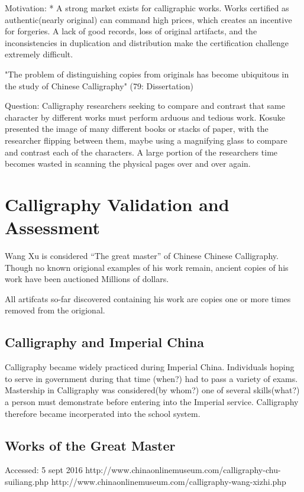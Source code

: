 Motivation:
    *  A strong market exists for calligraphic works.  Works certified as authentic(nearly original) can command high prices, which creates an incentive for forgeries.  A lack of good records, loss of original artifacts, and the inconsistencies in duplication and distribution make the certification challenge extremely difficult.


"The problem of distinguishing copies from originals has become ubiquitous in the study of Chinese Calligraphy" (79: Dissertation)

    Question:  Calligraphy researchers seeking to compare and contrast that same character by different works must perform arduous and tedious work.
                Kosuke presented the image of many different books or stacks of paper, with the researcher flipping between them,  maybe using a magnifying glass to compare and contrast each of the characters.  A large portion of the researchers time becomes wasted in scanning the physical pages over and over again.

\chapter{Calligraphy Validation and Assessment}

Wang Xu is considered ``The great master'' of Chinese Chinese Calligraphy.  Though no known origional examples of his work remain, ancient copies of his work have been auctioned Millions of dollars.

All artifcats so-far discovered containing his work are copies one or more times removed from the origional.

\section{Calligraphy and Imperial China}

Calligraphy became widely practiced during Imperial China.  Individuals hoping to serve in government during that time (when?) had to pass a variety of exams.  Mastership in Calligraphy was considered(by whom?) one of several skills(what?) a person must demonstrate before entering into the Imperial service.  Calligraphy therefore became incorperated into the school system. 

\section{Works of the Great Master}
Accessed:  5 sept 2016
http://www.chinaonlinemuseum.com/calligraphy-chu-suiliang.php 
http://www.chinaonlinemuseum.com/calligraphy-wang-xizhi.php


